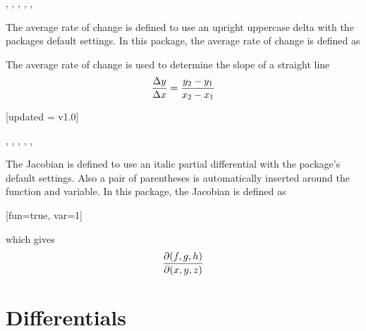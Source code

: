 	\begin{function}{\adv}
		\begin{syntax}
			\sarg, , , \targ{/}, , 
		\end{syntax}
		The average rate of change is defined to use an upright uppercase delta with the packages default settings. In this package, the average rate of change is defined as
		
		\begin{definition}
			\DeclareDerivative{\adv}{\Delta}%
		\end{definition}
		
		\noindent The average rate of change is used to determine the slope of a straight line
		\begin{equation*}
			\adv{ y }{ x } = \frac{y_2- y_1}{x_2 - x_1}
		\end{equation*}
	\end{function}
	
	\begin{function}{\jdv}[updated = v1.0]
		\begin{syntax}
			\sarg, , , \targ{/}, , \earg{\_, point\tsb{1}, \^, point\tsb{2}}
		\end{syntax}
		The Jacobian is defined to use an italic partial differential with the package's default settings. Also a pair of parentheses is automatically inserted around the function and variable. In this package, the Jacobian is defined as
		
		\begin{definition}
			\DeclareDerivative{\jdv}{\partial}[fun=true, var=1]%
		\end{definition}
		
		\noindent which gives
		\begin{equation*}
			\jdv{f,g,h}{x,y,z}
		\end{equation*}
	\end{function}
	
	
	
	\clearpage
	\section{Differentials}
	
